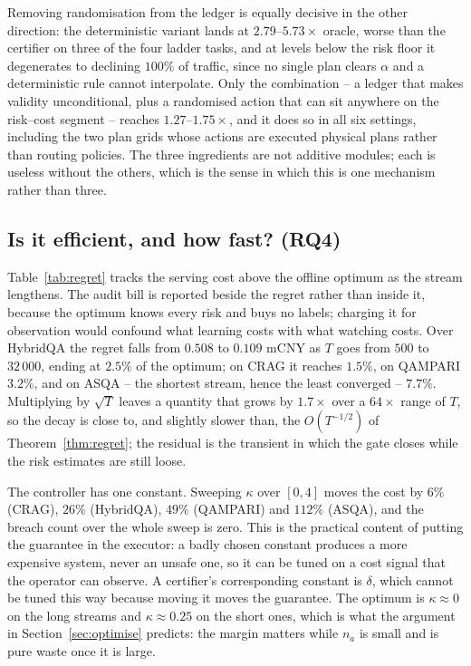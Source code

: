 Removing randomisation from the ledger is equally decisive in the other
direction: the deterministic variant lands at $2.79$--$5.73\times$
oracle, worse than the certifier on three of the four ladder tasks, and
at levels below the risk floor it degenerates to declining $100\%$ of
traffic, since no single plan clears $\alpha$ and a deterministic rule
cannot interpolate. Only the combination -- a ledger that makes
validity unconditional, plus a randomised action that can sit anywhere
on the risk--cost segment -- reaches $1.27$--$1.75\times$, and it does
so in all six settings,
including the two plan grids whose actions are executed physical plans
rather than routing policies. The three ingredients are not additive
modules; each is useless without the others, which is the sense in which
this is one mechanism rather than three.



\subsection{Is it efficient, and how fast? (RQ4)}
\label{sec:res:regret}

Table~\ref{tab:regret} tracks the serving cost above the offline optimum
as the stream lengthens. The audit bill is reported beside the regret
rather than inside it, because the optimum knows every risk and buys no
labels; charging it for observation would confound what learning costs
with what watching costs. Over HybridQA the regret falls from $0.508$ to
$0.109$ mCNY as $T$ goes from $500$ to $32\,000$, ending at $2.5\%$ of
the optimum; on CRAG it reaches $1.5\%$, on QAMPARI $3.2\%$, and on
ASQA -- the shortest stream, hence the least converged -- $7.7\%$.
Multiplying by $\sqrt{T}$ leaves a quantity that grows by $1.7\times$
over a $64\times$ range of $T$, so the decay is close to, and slightly
slower than, the $O(T^{-1/2})$ of Theorem~\ref{thm:regret}; the residual
is the transient in which the gate closes while the risk estimates are
still loose.

The controller has one constant. Sweeping $\kappa$ over $[0,4]$ moves
the cost by $6\%$ (CRAG), $26\%$ (HybridQA), $49\%$ (QAMPARI) and
$112\%$ (ASQA), and the breach count over the whole sweep is zero. This
is the practical content of putting the guarantee in the executor: a
badly chosen constant produces a more expensive system, never an unsafe
one, so it can be tuned on a cost signal that the operator can observe.
A certifier's corresponding constant is $\delta$, which cannot be tuned
this way because moving it moves the guarantee. The optimum is
$\kappa \approx 0$ on the long streams and $\kappa \approx 0.25$ on the
short ones, which is what the argument in Section~\ref{sec:optimise}
predicts: the margin matters while $n_a$ is small and is pure waste once
it is large.


